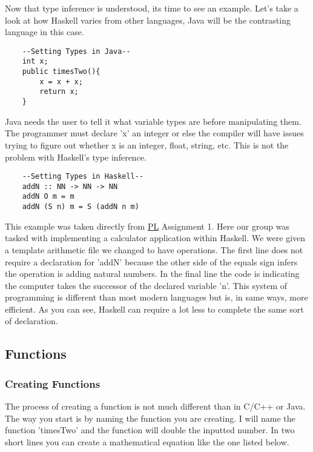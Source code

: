 \documentclass{article}
\begin{document}
    \medskip\noindent Now that type inference is understood, its time to see an example. Let's take a look at how Haskell varies from other languages, Java will be the contrasting language in this case.
    \begin{lstlisting}
    --Setting Types in Java--
    int x;
    public timesTwo(){
        x = x + x;
        return x;
    }
    \end{lstlisting}
    
    \medskip
    Java needs the user to tell it what variable types are before manipulating them. The programmer must declare 'x' an integer or else the compiler will have issues trying to figure out whether x is an integer, float, string, etc. This is not the problem with Haskell's type inference.
    
    \begin{lstlisting}
    --Setting Types in Haskell--
    addN :: NN -> NN -> NN
    addN O m = m
    addN (S n) m = S (addN n m)
    \end{lstlisting}
    
    \noindent This example was taken directly from \href{PL}{PL} Assignment 1. Here our group was tasked with implementing a calculator application within Haskell. We were given a template arithmetic file we changed to have operations. The first line does not require a declaration for 'addN' because the other side of the equals sign infers the operation is adding natural numbers. In the final line the code is indicating the computer takes the successor of the declared variable 'n'. This system of programming is different than most modern languages but is, in same ways, more efficient. As you can see, Haskell can require a lot less to complete the same sort of declaration.
    
\subsection{Functions}
    
    \subsubsection{Creating Functions}
    The process of creating a function is not much different than in C/C++ or Java. The way you start is by naming the function you are creating. I will name the function 'timesTwo' and the function will double the inputted number. In two short lines you can create a mathematical equation like the one listed below. 
    
\end{document}
